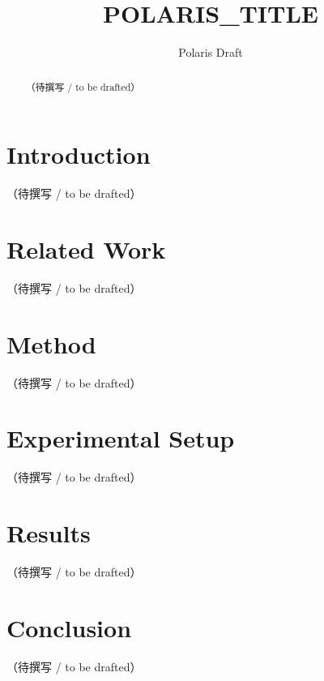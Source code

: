 \documentclass{article}
\title{{{POLARIS_TITLE}}}
\author{Polaris Draft}
\begin{document}
\maketitle

\begin{abstract}
（待撰写 / to be drafted）
\end{abstract}

\section{Introduction}\label{sec:introduction}
（待撰写 / to be drafted）

\section{Related Work}\label{sec:related_work}
（待撰写 / to be drafted）

\section{Method}\label{sec:method}
（待撰写 / to be drafted）

\section{Experimental Setup}\label{sec:experimental_setup}
（待撰写 / to be drafted）

\section{Results}\label{sec:results}
（待撰写 / to be drafted）

\section{Conclusion}\label{sec:conclusion}
（待撰写 / to be drafted）



\end{document}
